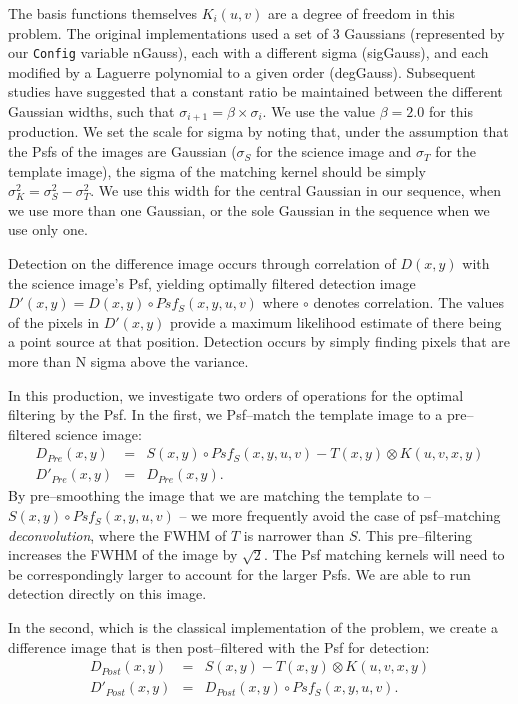 \documentclass[prd, nofootinbib, floatfix, 11pt,tightenlines,times]{article}
\begin{document}
The basis functions themselves $K_i(u,v)$ are a degree of freedom in
this problem.  The original implementations \citep{Alard98,Alard00}
used a set of 3 Gaussians (represented by our {\tt Config} variable
nGauss), each with a different sigma (sigGauss), and each modified by
a Laguerre polynomial to a given order (degGauss).  Subsequent studies
\citep[e.g.][]{2007AN....328...16I} have suggested that a constant
ratio be maintained between the different Gaussian widths, such that
$\sigma_{i+1} = \beta \times \sigma_{i}$.  We use the value $\beta =
2.0$ for this production.  We set the scale for sigma by noting that,
under the assumption that the Psfs of the images are Gaussian
($\sigma_S$ for the science image and $\sigma_T$ for the template
image), the sigma of the matching kernel should be simply $\sigma_K^2
= \sigma_S^2 - \sigma_T^2$.  We use this width for the central
Gaussian in our sequence, when we use more than one Gaussian, or the
sole Gaussian in the sequence when we use only one.

Detection on the difference image occurs through correlation of
$D(x,y)$ with the science image's Psf, yielding optimally filtered
detection image $D'(x,y) = D(x,y) \circ Psf_S(x,y,u,v)$ where $\circ$
denotes correlation.  The values of the pixels in $D'(x,y)$ provide a
maximum likelihood estimate of there being a point source at that
position.  Detection occurs by simply finding pixels that are more
than N sigma above the variance.  

In this production, we investigate two orders of operations for the
optimal filtering by the Psf.  In the first, we Psf--match the
template image to a pre--filtered science image:
\begin{eqnarray}
D_{Pre}(x,y) & = & S(x,y) \circ Psf_S(x,y,u,v) - T(x,y) \otimes K(u,v,x,y) \nonumber \\ 
D'_{Pre}(x,y) & = & D_{Pre}(x,y). \nonumber 
\end{eqnarray}
By pre--smoothing the image that we are matching the template to --
$S(x,y) \circ Psf_S(x,y,u,v)$ -- we more frequently avoid the case
of psf--matching {\it deconvolution}, where the FWHM of $T$ is
narrower than $S$.  This pre--filtering increases the FWHM of the
image by $\sqrt{2}$.  The Psf matching kernels will need to be
correspondingly larger to account for the larger Psfs.  We are able to
run detection directly on this image.

In the second, which is the classical implementation of the problem,
we create a difference image that is then post--filtered with the Psf
for detection:
\begin{eqnarray}
D_{Post}(x,y) & = & S(x,y) - T(x,y) \otimes K(u,v,x,y) \nonumber \\ 
D'_{Post}(x,y) & = & D_{Post}(x,y) \circ Psf_S(x,y,u,v).  \nonumber 
\end{eqnarray}
\end{document}
